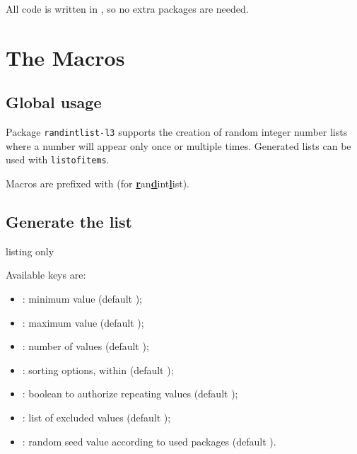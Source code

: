 \documentclass[11pt,a4paper]{ltxdoc}
\begin{document}
All code is written in , so no extra packages are needed.

\section{The Macros}

\subsection{Global usage}

Package \texttt{randintlist-l3} supports the creation of random integer number lists where a number will appear only once or multiple times. Generated lists can be used with \texttt{listofitems}.

\medskip

{\small\faLightbulb} Macros are prefixed with  (for \textsf{\textbf{\underline{r}}an\textbf{\underline{d}}int\textbf{\underline{l}}ist}).

\subsection{Generate the list}

\begin{DemoCode}{listing only}
\rdlgenlist[keys]{\macro}
\end{DemoCode}

Available keys are:

\begin{itemize}
	\item {}: minimum value (default );
	\item {}: maximum value (default );
	\item {}: number of values (default );
	\item {}: sorting options, within  (default );
	\item {}: boolean to authorize repeating values (default );
	\item {}: list of excluded values (default );
	\item {}: random seed value according to used packages (default ).
\end{itemize}

\begin{DemoCode}{}
\rdlgenlist{\mylistA}\mylistA
\end{DemoCode}
\end{document}
